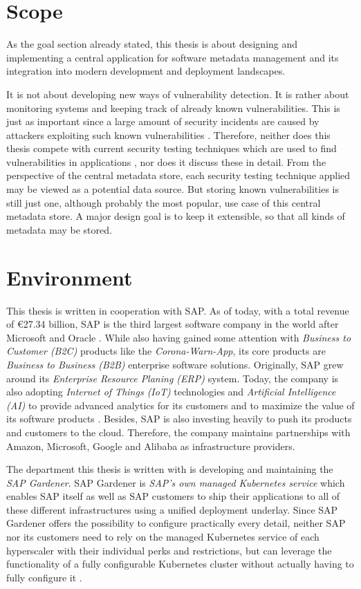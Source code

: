 \section{Scope}
As the goal section already stated, this thesis is about designing and implementing a central application for software metadata management and its integration into modern development and deployment landscapes.\par
It is not about developing new ways of vulnerability detection. It is rather about monitoring systems and keeping track of already known vulnerabilities. This is just as important since a large amount of security incidents are caused by attackers exploiting such known vulnerabilities \cite{ModelBasedSecurityTesting}. Therefore, neither does this thesis compete with current security testing techniques which are used to find vulnerabilities in applications \cite{SecurityTesting}, nor does it discuss these in detail. From the perspective of the central metadata store, each security testing technique applied may be viewed as a potential data source. But storing known vulnerabilities is still just one, although probably the most popular, use case of this central metadata store. A major design goal is to keep it extensible, so that all kinds of metadata may be stored.  

\section{Environment}
This thesis is written in cooperation with SAP. As of today, with a total revenue of €27.34 billion, SAP is the third largest software company in the world after Microsoft and Oracle \cite{LargestSoftwareCompanies}. While also having gained some attention with \textit{Business to Customer (B2C)} products like the \textit{Corona-Warn-App}, its core products are \textit{Business to Business (B2B)} enterprise software solutions. Originally, SAP grew around its \textit{Enterprise Resource Planing (ERP)} system. Today, the company is also adopting \textit{Internet of Things (IoT)} technologies and \textit{Artificial Intelligence (AI)} to provide advanced analytics for its customers and to maximize the value of its software products \cite{AboutSAP}. Besides, SAP is also investing heavily to push its products and customers to the cloud. Therefore, the company maintains partnerships with Amazon, Microsoft, Google and Alibaba as infrastructure providers.\par 
The department this thesis is written with is developing and maintaining the \textit{SAP Gardener}. SAP Gardener is \textit{SAP's own managed Kubernetes service} which enables SAP itself as well as SAP customers to ship their applications to all of these different infrastructures using a unified deployment underlay. Since SAP Gardener offers the possibility to configure practically every detail, neither SAP nor its customers need to rely on the managed Kubernetes service of each hyperscaler with their individual perks and restrictions, but can leverage the functionality of a fully configurable Kubernetes cluster without actually having to fully configure it \cite{GardenerValueProposition}. 
   
